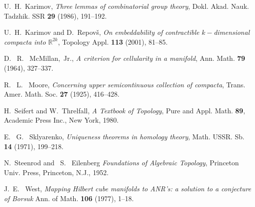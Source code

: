 \begin{thebibliography}{999}
U.~H.~Karimov, \emph{Three lemmas of combinatorial group theory},
{Dokl. Akad. Nauk. Tadzhik. SSR} \textbf{29} (1986), 191--192.

U.~H.~Karimov and D.~Repov\v s, \emph{On embeddability of
contractible $k-$dimensional compacta into $\mathbb{R}^{2k}$},
{Topology Appl.} \textbf{113} (2001), 81--85.

D.~ R.~ McMillan,~Jr., \emph{A criterion for cellularity in a
manifold}, {Ann. Math.} \textbf{79} (1964), 327--337.

R.~ L.~ Moore, \emph{Concerning upper semicontinuous collection of
compacta}, {Trans. Amer. Math. Soc.} \textbf{27} (1925), 416--428.

H.~Seifert and W.~Threlfall, \emph{A Textbook of Topology}, Pure
and Appl. Math. \textbf{89}, Academic Press Inc., New York, 1980.

E.~ G.~ Sklyarenko, \emph{Uniqueness theorems in homology theory},
{Math. USSR. Sb.} \textbf{14} (1971), 199--218.

N.~Steenrod and ~S.~ Eilenberg \emph{Foundations of Algebraic
Topology}, Princeton Univ. Press, Princeton, N.J., 1952.

J.~E.~ West, \emph{Mapping Hilbert cube manifolds to ANR's: a
solution to a conjecture of Borsuk} {Ann. of Math.} \textbf{ 106}
(1977), 1--18.

\end{thebibliography}


